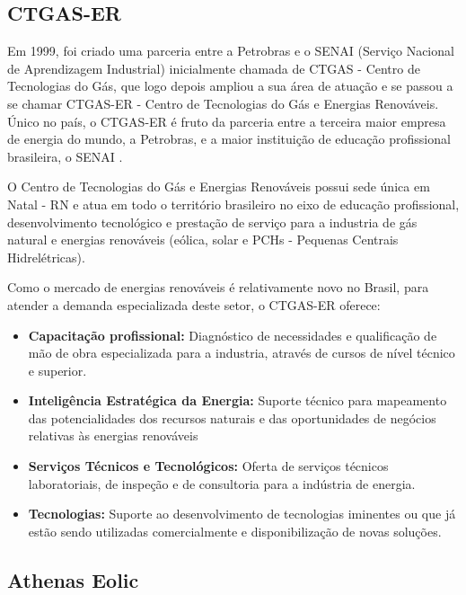 \subsection{CTGAS-ER}
\label{Sec:cetgas-er}

Em 1999, foi criado uma parceria entre a Petrobras e o SENAI (Serviço Nacional de Aprendizagem Industrial) inicialmente chamada de CTGAS - Centro de Tecnologias do Gás, que logo depois ampliou a sua área de atuação e se passou a se chamar CTGAS-ER - Centro de Tecnologias do Gás e Energias Renováveis. Único no país, o CTGAS-ER é fruto da parceria entre a terceira maior empresa de energia do mundo, a Petrobras, e a maior instituição de educação profissional brasileira, o SENAI \cite{ctgas-apresentacao}.

O Centro de Tecnologias do Gás e Energias Renováveis possui sede única em Natal - RN e atua em todo o território brasileiro no eixo de educação profissional, desenvolvimento tecnológico e prestação de serviço para a industria de gás natural e energias renováveis (eólica, solar e PCHs - Pequenas Centrais Hidrelétricas).

Como o mercado de energias renováveis é relativamente novo no Brasil, para atender a demanda especializada deste setor, o CTGAS-ER oferece:

\begin{itemize}
    \item \textbf{Capacitação profissional:} Diagnóstico de necessidades e qualificação de mão de obra especializada para a industria, através de cursos de nível técnico e superior.
    \item  \textbf{Inteligência Estratégica da Energia:} Suporte técnico para mapeamento das potencialidades dos recursos naturais e das oportunidades de negócios relativas às energias renováveis
    \item  \textbf{Serviços Técnicos e Tecnológicos:} Oferta de serviços técnicos laboratoriais, de inspeção e de consultoria para a indústria de energia.
    \item  \textbf{Tecnologias:} Suporte ao desenvolvimento de tecnologias iminentes ou que já estão sendo utilizadas comercialmente e disponibilização de novas soluções.
\end{itemize}

\subsection{Athenas Eolic}
\label{Sec:athenasEolic}

